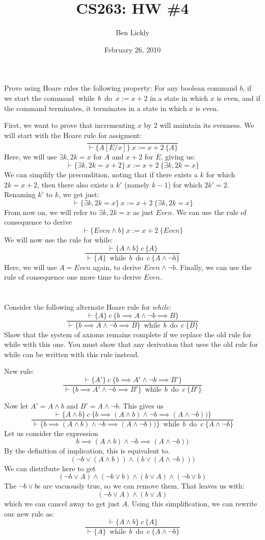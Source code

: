 \documentclass{article}
\title{CS263: HW \#4}
\author{Ben Lickly}
\date{February 26, 2010}
\newcommand{\problem}[1]
{\subsubsection*{} %
\vspace{-16pt} \section{} \vspace{-22pt} \qquad
#1%
\bigskip \bigskip
}
\newcommand{\while}[2]{\operatorname{while}\, #1\ \operatorname{do}\ #2}
\newcommand{\proves}{\vdash}
\newcommand{\axiomatic}[3]{\{#1\}\ #2\ \{#3\}}
\begin{document}
\maketitle

\problem{
Prove using Hoare rules the following property: For any boolean
command $b$, if we start the command $\while{b}{x := x + 2}$ in a state in
which $x$ is even, and if the command terminates, it terminates in a state in
which $x$ is even.
}
First, we want to prove that incrementing $x$ by 2 will maintain its evenness.
We will start with the Hoare rule for assigment:
\[
\frac{ }
{\proves \axiomatic{A[E/x]}{x := x + 2}{A}}
\]
Here, we will use $\exists k, 2k = x$ for $A$
and $x+2$ for $E$, giving us:
\[
\proves \axiomatic{\exists k, 2k = x + 2}{x := x + 2}{\exists k, 2k = x}
\]
We can simplify the precondition, noting that if there exists a $k$ for which
$2k = x +2$, then there also exists a $k'$ (namely $k-1$) for which $2k' = 2$.
Renaming $k'$ to $k$, we get just:
\[
\proves \axiomatic{\exists k, 2k = x}{x := x + 2}{\exists k, 2k = x}
\]
From now on, we will refer to $\exists k, 2k = x$ as just $Even$.
We can use the rule of consequence to derive
\[
\proves \axiomatic{Even \wedge b}{x := x + 2}{Even}
\]
We will now use the rule for while:
\[
\frac{\proves \axiomatic{A \wedge b}{c}{A}}
{\proves \axiomatic{A}{\while{b}{c}}{A \wedge \neg b}}
\]
Here, we will use $A = Even$ again, to derive $Even \wedge \neg b$.
Finally, we can use the rule of consequence one more time to derive $Even$.

\problem{Consider the following alternate Hoare rule for $while$:
\[
\frac{\proves \axiomatic{A}{c}{b \implies A \wedge \neg b \implies B}}
{\proves \axiomatic{b \implies A \wedge \neg b \implies B}{\while{b}{c}}{B}}
\]
Show that the system of axioms remains complete if we replace the old
rule for while with this one. You must show that any derivation that uses
the old rule for while can be written with this rule instead.
}

New rule:
\[
\frac{\proves \axiomatic{A'}{c}{b \implies A' \wedge \neg b \implies B'}}
{\proves \axiomatic{b \implies A' \wedge \neg b \implies B'}{\while{b}{c}}{B'}}
\]

Now let $A' = A \wedge b$ and $B' = A \wedge \neg b$.
This gives us
\[
\frac{\proves \axiomatic {A \wedge b} {c}
  {b \implies (A \wedge b) \wedge \neg b \implies (A \wedge \neg b))}}
{\proves \axiomatic
  {b \implies (A \wedge b) \wedge \neg b \implies (A \wedge \neg b))}
  {\while{b}{c}} {A \wedge \neg b}}
\]
Let us consider the expression 
\[
b \implies (A \wedge b) \wedge \neg b \implies (A \wedge \neg b))
\]
By the definition of implication, this is equivalent to.
\[
(\neg b \vee (A \wedge b)) \wedge (b \vee (A \wedge \neg b)))
\]
We can distribute here to get
\[
(\neg b \vee A) \wedge (\neg b \vee b) \wedge (b \vee A) \wedge (\neg b \vee b)
\]
The $\neg b \vee b$s are vacuously true, so we can remove them.  That leaves us
with:
\[
(\neg b \vee A) \wedge (b \vee A)
\]
which we can cancel away to get just $A$.  Using this simplification, we can
rewrite our new rule as:
\[
\frac{\proves \axiomatic{A \wedge b}{c}{A}}
{\proves \axiomatic{A}{\while{b}{c}}{A \wedge \neg b}}
\]
\end{document}

